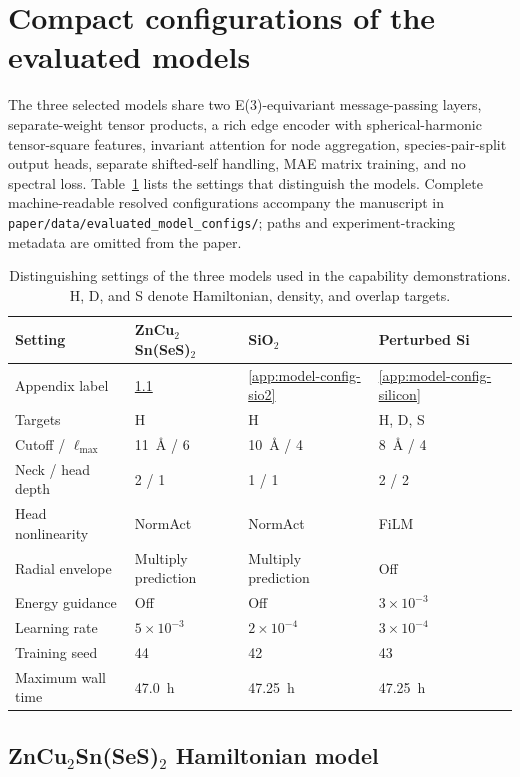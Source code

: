 \section{Compact configurations of the evaluated models}
\label{app:model-configurations}

The three selected models share two E(3)-equivariant message-passing layers, separate-weight tensor products, a rich edge encoder with spherical-harmonic tensor-square features, invariant attention for node aggregation, species-pair-split output heads, separate shifted-self handling, MAE matrix training, and no spectral loss. Table~\ref{tab:evaluated-configs} lists the settings that distinguish the models. Complete machine-readable resolved configurations accompany the manuscript in \texttt{paper/data/evaluated\_model\_configs/}; paths and experiment-tracking metadata are omitted from the paper.

\begin{table}[H]
\centering
\scriptsize
\caption{Distinguishing settings of the three models used in the capability demonstrations. H, D, and S denote Hamiltonian, density, and overlap targets.}
\label{tab:evaluated-configs}
\begin{tabular}{p{}p{}p{}p{}}
\toprule
Setting & ZnCu$_2$Sn(SeS)$_2$ & SiO$_2$ & Perturbed Si \\
\midrule
Appendix label &
\ref{app:model-config-zncusnses} &
\ref{app:model-config-sio2} &
\ref{app:model-config-silicon} \\
Targets & H & H & H, D, S \\
Cutoff / $\ell_{\max}$ & 11~\r{A} / 6 & 10~\r{A} / 4 & 8~\r{A} / 4 \\
Neck / head depth & 2 / 1 & 1 / 1 & 2 / 2 \\
Head nonlinearity & NormAct & NormAct & FiLM \\
Radial envelope & Multiply prediction & Multiply prediction & Off \\
Energy guidance & Off & Off & $3\times10^{-3}$ \\
Learning rate & $5\times10^{-3}$ & $2\times10^{-4}$ & $3\times10^{-4}$ \\
Training seed & 44 & 42 & 43 \\
Maximum wall time & 47.0~h & 47.25~h & 47.25~h \\
\bottomrule
\end{tabular}
\end{table}

\subsection{ZnCu$_2$Sn(SeS)$_2$ Hamiltonian model}
\label{app:model-config-zncusnses}

